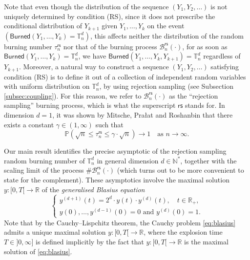 \documentclass[a4paper,11pt]{article}
\begin{document}
Note that even though the distribution of the sequence $(Y_1,Y_2,\ldots)$ is not uniquely determined by condition (RS), since it does not prescribe the conditional distribution of $Y_{k+1}$ given $Y_1,\ldots,Y_k$ on the event $\left(\mathsf{Burned}(Y_1,\ldots,Y_k)=\mathbb{T}_n^d\right)$, this affects neither the distribution of the random burning number $\tau_n^\mathsf{rs}$ nor that of the burning process $\mathcal{B}_n^\mathsf{rs}(\cdot)$, for as soon as ${\mathsf{Burned}(Y_1,\ldots,Y_k)=\mathbb{T}_n^d}$, we have $\mathsf{Burned}(Y_1,\ldots,Y_k,Y_{k+1})=\mathbb{T}_n^d$ regardless of $Y_{k+1}$.
Moreover, a natural way to construct a sequence $(Y_1,Y_2,\ldots)$ satisfying condition (RS) is to define it out of a collection of independent random variables with uniform distribution on $\mathbb{T}_n^d$, by using rejection sampling (see Subsection \ref{subsec:coupling}).
For this reason, we refer to $\mathcal{B}_n^\mathsf{rs}(\cdot)$ as the ``rejection sampling'' burning process, which is what the superscript $\mathsf{rs}$ stands for.
In dimension $d=1$, it was shown by Mitsche, Pra\l{}at and Roshanbin \cite[Theorem 1.4(ii)]{mitschepralatroshanbin} that there exists a constant $\gamma\in(1,\infty)$ such that
\begin{equation}\label{eq:costdrunk}
\mathbb{P}\left(\sqrt{n}\leq\tau_n^\mathsf{rs}\leq\gamma\cdot\sqrt{n}\right)\longrightarrow1\quad\text{as $n\to\infty$.}
\end{equation}

Our main result identifies the precise asymptotic of the rejection sampling random burning number of $\mathbb{T}_n^d$ in general dimension $d\in\mathbb{N}^*$, together with the scaling limit of the process $\#\mathcal{B}_n^\mathsf{rs}(\cdot)$ (which turns out to be more convenient to state for the complement).
These asymptotics involve the maximal solution $y:{[0,T[}\rightarrow\mathbb{R}$ of the \emph{generalised Blasius equation}
\begin{equation}\label{eq:blasius}
\begin{cases}
y^{(d+1)}(t)=2^d\cdot y(t)\cdot y^{(d)}(t),\quad t\in\mathbb{R}_+,\\
\text{$y(0),\ldots,y^{(d-1)}(0)=0$ and $y^{(d)}(0)=1$.}
\end{cases}
\end{equation}
Note that by the Cauchy--Lispchitz theorem, the Cauchy problem \eqref{eq:blasius} admits a unique maximal solution $y:{[0,T[}\rightarrow\mathbb{R}$, where the explosion time $T\in{]0,\infty]}$ is defined implicitly by the fact that $y:{[0,T[}\rightarrow\mathbb{R}$ is the maximal solution of \eqref{eq:blasius}.
\end{document}
